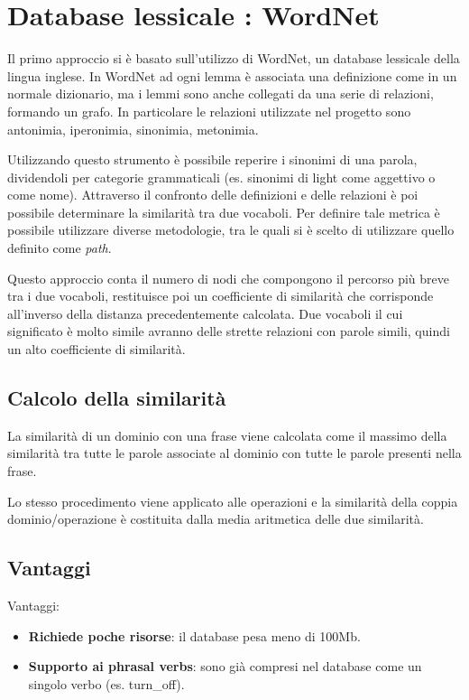 \documentclass[twoside]{supsistudent}
\begin{document}
\section{Database lessicale : WordNet}
Il primo approccio si è basato sull'utilizzo di WordNet, un database lessicale della lingua inglese.
In WordNet ad ogni lemma è associata una definizione come in un normale dizionario, ma i lemmi sono anche collegati da una serie di relazioni, formando un grafo. In particolare le relazioni utilizzate nel progetto sono antonimia, iperonimia, sinonimia, metonimia.\cite{wordNet}

Utilizzando questo strumento è possibile reperire i sinonimi di una parola, dividendoli per categorie grammaticali (es. sinonimi di light come aggettivo o come nome).
Attraverso il confronto delle definizioni e delle relazioni è poi possibile determinare la similarità tra due vocaboli. Per definire tale metrica è possibile utilizzare diverse metodologie, tra le quali si è scelto di utilizzare quello definito come \textit{path}. \cite{wordNetWordSimilarity}

Questo approccio conta il numero di nodi che compongono il percorso più breve tra i due vocaboli, restituisce poi un coefficiente di similarità che corrisponde all'inverso della distanza precedentemente calcolata. Due vocaboli il cui significato è molto simile avranno delle strette relazioni con parole simili, quindi un alto coefficiente di similarità.\cite{wordNetPathSimilarity}
\subsection{Calcolo della similarità}
La similarità di un dominio con una frase viene calcolata come il massimo della similarità tra tutte le parole associate al dominio con tutte le parole presenti nella frase.

Lo stesso procedimento viene applicato alle operazioni e la similarità della coppia dominio/operazione è costituita dalla media aritmetica delle due similarità.
\subsection{Vantaggi}
Vantaggi:
 \begin{itemize}
  \item \textbf{Richiede poche risorse}: il database pesa meno di 100Mb.
  \item \textbf{Supporto ai phrasal verbs}: sono già compresi nel database come un singolo verbo (es. turn\_off).
\end{itemize}
\end{document}
